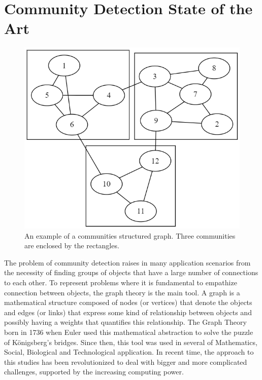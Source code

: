 \section{Community Detection State of the Art}
\begin{figure}[h]
	\centering
	\includegraphics[width=0.6\linewidth]{0-resources/community1}
	\caption{An example of a communities structured graph. Three communities are enclosed by the rectangles.}
	\label{fig:community1}
\end{figure}
\noindent The problem of community detection raises in many application scenarios from the necessity of finding groups of objects that have a large number of connections to each other. To represent problems where it is fundamental to empathize connection between objects, the graph theory is the main tool. A graph is a mathematical structure composed of nodes (or vertices) that denote the objects and edges (or links) that express some kind of relationship between objects and possibly having a weights that quantifies this relationship.
The Graph Theory born in 1736 when Euler used this mathematical abstraction to solve the puzzle of Königsberg’s bridges. Since then, this tool was used in several of Mathematics, Social, Biological and Technological application. In recent time, the approach to this studies has been revolutionized to deal with bigger and more complicated challenges, supported by the increasing computing power.
